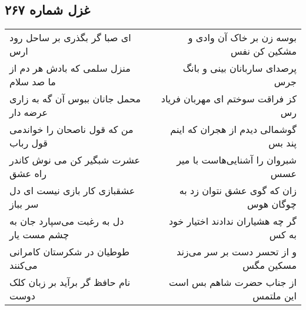 \begin{center}
\section*{غزل شماره ۲۶۷}
\label{sec:sh267}
\begin{longtable}{l p{0.5cm} r}
ای صبا گر بگذری بر ساحل رود ارس
&&
بوسه زن بر خاک آن وادی و مشکین کن نفس
\\
منزل سلمی که بادش هر دم از ما صد سلام
&&
پرصدای ساربانان بینی و بانگ جرس
\\
محمل جانان ببوس آن گه به زاری عرضه دار
&&
کز فراقت سوختم ای مهربان فریاد رس
\\
من که قول ناصحان را خواندمی قول رباب
&&
گوشمالی دیدم از هجران که اینم پند بس
\\
عشرت شبگیر کن می نوش کاندر راه عشق
&&
شبروان را آشنایی‌هاست با میر عسس
\\
عشقبازی کار بازی نیست ای دل سر بباز
&&
زان که گوی عشق نتوان زد به چوگان هوس
\\
دل به رغبت می‌سپارد جان به چشم مست یار
&&
گر چه هشیاران ندادند اختیار خود به کس
\\
طوطیان در شکرستان کامرانی می‌کنند
&&
و از تحسر دست بر سر می‌زند مسکین مگس
\\
نام حافظ گر برآید بر زبان کلک دوست
&&
از جناب حضرت شاهم بس است این ملتمس
\\
\end{longtable}
\end{center}
